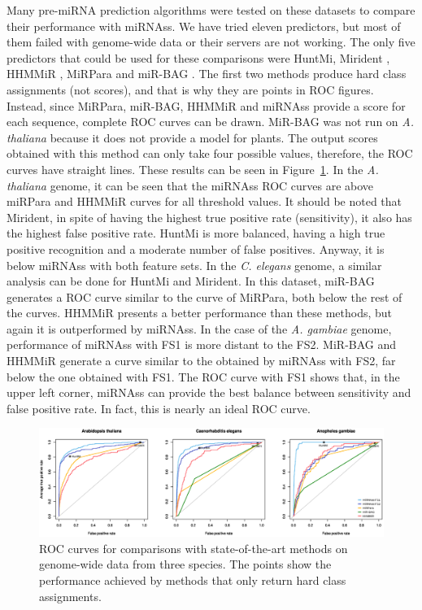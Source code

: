 \documentclass{article}
\begin{document}
Many pre-miRNA prediction algorithms were tested on these datasets to compare their performance with miRNAss. We have tried eleven predictors, but most of them failed with genome-wide data or their servers are not working. The only five predictors that could be used for these comparisons were HuntMi, Mirident \citep{liu2012integrated}, HHMMiR \citep{kadri2009hhmmir}, MiRPara \citep{wu2011mirpara} and miR-BAG \citep{jha2012mir}. The first two methods produce hard class assignments (not scores), and that is why they are points in ROC figures. Instead, since MiRPara, miR-BAG, HHMMiR and miRNAss provide a score for each sequence, complete ROC curves can be drawn. MiR-BAG was not run on \textit{A. thaliana} because it does not provide a model for plants. The output scores obtained with this method can only take four possible values, therefore, the ROC curves have straight lines. These results can be seen in Figure~\ref{fig:ROC}.
In the \textit{A. thaliana} genome, it can be seen that the miRNAss ROC curves are above miRPara and HHMMiR curves for all threshold values. It should be noted that Mirident, in spite of having the highest true positive rate (sensitivity), it also has the highest false positive rate. HuntMi is more balanced, having a high true positive recognition and a moderate number of false positives. Anyway, it is below miRNAss with both feature sets.
In the \textit{C. elegans} genome, a similar analysis can be done for HuntMi and Mirident. In this dataset, miR-BAG generates a ROC curve similar to the curve of MiRPara, both below the rest of the curves. HHMMiR presents a better performance than these methods, but again it is outperformed by miRNAss.
In the case of the \textit{A. gambiae} genome, performance of miRNAss with FS1 is more distant to the FS2. MiR-BAG and HHMMiR generate a curve similar to the obtained by miRNAss with FS2, far below the one obtained with FS1. The ROC curve with FS1 shows that, in the upper left corner, miRNAss can provide the best balance between sensitivity and false positive rate. In fact, this is nearly an ideal ROC curve.
\begin{figure}[tpb]
	\centering
	\includegraphics[width=\linewidth]{genome-wide_ROC.eps}
	\caption{ROC curves for comparisons with state-of-the-art methods on genome-wide data from three species. The points show the performance achieved by methods that only return hard class assignments.}
	\label{fig:ROC}
\end{figure}
\end{document}

